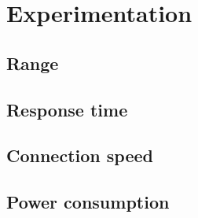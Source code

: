 \section{Experimentation}

\subsection{Range}

\subsection{Response time}

\subsection{Connection speed}

\subsection{Power consumption}
